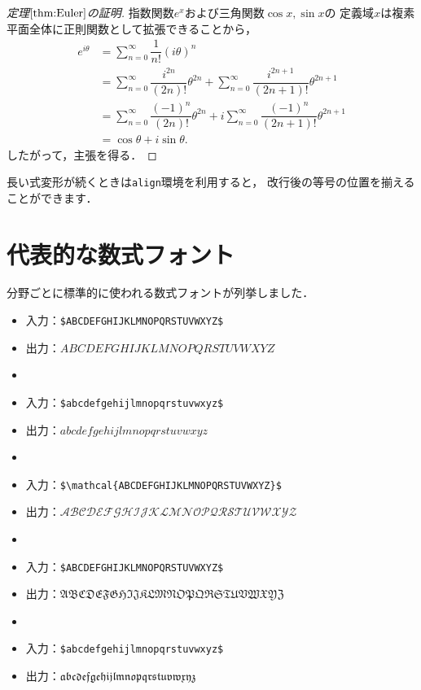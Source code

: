 \documentclass[12pt,a4j,final]{jreport}
\theoremstyle{definition}
\begin{document}
\begin{proof}[定理$\ref{thm:Euler}$の証明]
指数関数$e^{x}$および三角関数$\cos x, \sin x$の
定義域$x$は複素平面全体に正則関数として拡張できることから，
\begin{align*}
e^{i\theta}
&= \sum_{n=0}^{\infty}\dfrac{1}{n!}(i\theta)^{n}\\
&= \sum_{n=0}^{\infty}\dfrac{i^{2n}}{(2n)!}\theta^{2n}
+ \sum_{n=0}^{\infty}\dfrac{i^{2n+1}}{(2n+1)!}\theta^{2n+1}\\
&= \sum_{n=0}^{\infty}\dfrac{(-1)^{n}}{(2n)!}\theta^{2n}
+ i\sum_{n=0}^{\infty}\dfrac{(-1)^{n}}{(2n+1)!}\theta^{2n+1}\\
&= \cos\theta + i\sin\theta.
\end{align*}
したがって，主張を得る．
\end{proof}

長い式変形が続くときは\verb|align|環境を利用すると，
改行後の等号の位置を揃えることができます．

\section*{代表的な数式フォント}

分野ごとに標準的に使われる数式フォントが列挙しました．

\begin{itemize}
\item 入力：\verb|$ABCDEFGHIJKLMNOPQRSTUVWXYZ$|
\item 出力：$ABCDEFGHIJKLMNOPQRSTUVWXYZ$
\item[]
\item 入力：\verb|$abcdefgehijlmnopqrstuvwxyz$| 
\item 出力：$abcdefgehijlmnopqrstuvwxyz$
\item[]
\item 入力：\verb|$\mathcal{ABCDEFGHIJKLMNOPQRSTUVWXYZ}$|
\item 出力：$\mathcal{ABCDEFGHIJKLMNOPQRSTUVWXYZ}$
\item[]
\item 入力：\verb|$ABCDEFGHIJKLMNOPQRSTUVWXYZ$| 
\item 出力：$\mathfrak{ABCDEFGHIJKLMNOPQRSTUVWXYZ}$
\item[]
\item 入力：\verb|$abcdefgehijlmnopqrstuvwxyz$|
\item 出力：$\mathfrak{abcdefgehijlmnopqrstuvwxyz}$
\end{itemize}
\end{document}
